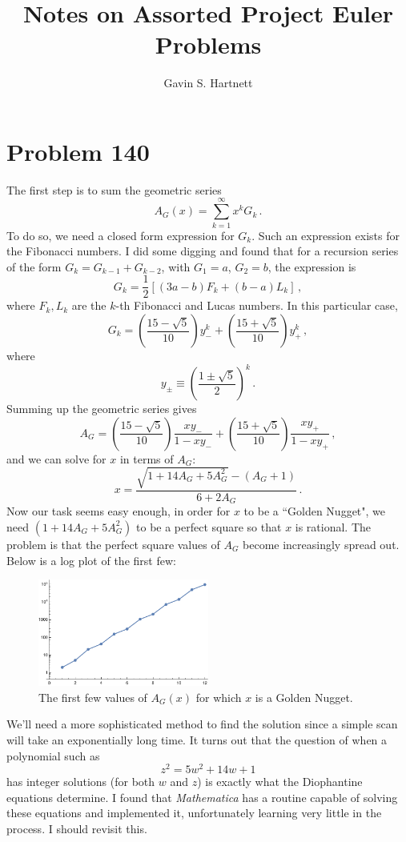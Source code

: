 \documentclass[a4paper,12pt]{article}
\title{\vspace{-1.7 cm} Notes on Assorted Project Euler Problems}
\author{Gavin S. Hartnett}
\date{}
\begin{document}
\maketitle
\vspace{-0.5cm}
\section{Problem 140}
The first step is to sum the geometric series 
$$ A_G(x) = \sum_{k=1}^{\infty} x^k G_k \, . $$
To do so, we need a closed form expression for $G_k$. Such an expression exists for the Fibonacci numbers. I did some digging and found that for a recursion series of the form $G_k = G_{k-1} + G_{k-2}$, with $G_1 = a$, $G_2 = b$, the expression is
$$ G_k = \frac{1}{2} \left[ (3 a -b) F_k + (b-a) L_k \right] \, , $$
where $F_k, L_k$ are the $k$-th Fibonacci and Lucas numbers. In this particular case, 
$$ G_k = \left( \frac{15 - \sqrt{5}}{10} \right) y_-^k + \left( \frac{15 + \sqrt{5}}{10} \right) y_+^k \, , $$
where
$$ y_{\pm} \equiv \left( \frac{1 \pm \sqrt{5}}{2} \right)^k \, .$$
Summing up the geometric series gives
$$ A_G = \left( \frac{15 - \sqrt{5}}{10} \right) \frac{x y_-}{1- x y_-} + \left( \frac{15 + \sqrt{5}}{10} \right) \frac{x y_+}{1- x y_+} \, , $$
and we can solve for $x$ in terms of $A_G$:
$$ x = \frac{\sqrt{1+14 A_G + 5 A_G^2} - (A_G + 1)}{6 + 2 A_G} \, . $$
Now our task seems easy enough, in order for $x$ to be a ``Golden Nugget", we need $(1 + 14 A_G + 5 A_G^2)$ to be a perfect square so that $x$ is rational. The problem is that the perfect square values of $A_G$ become increasingly spread out. Below is a log plot of the first few:
\begin{figure}[h!]
\begin{center}
\includegraphics[width=0.5\textwidth]{Figures/p140.pdf}
\end{center}
\caption{The first few values of $A_G(x)$ for which $x$ is a Golden Nugget.}
\end{figure}

We'll need a more sophisticated method to find the solution since a simple scan will take an exponentially long time. It turns out that the question of when a polynomial such as 
$$ z^2 = 5 w^2 + 14 w + 1$$
has integer solutions (for both $w$ and $z$) is exactly what the Diophantine equations determine. I found that \textit{Mathematica} has a routine capable of solving these equations and implemented it, unfortunately learning very little in the process. I should revisit this.


{}

\end{document}
